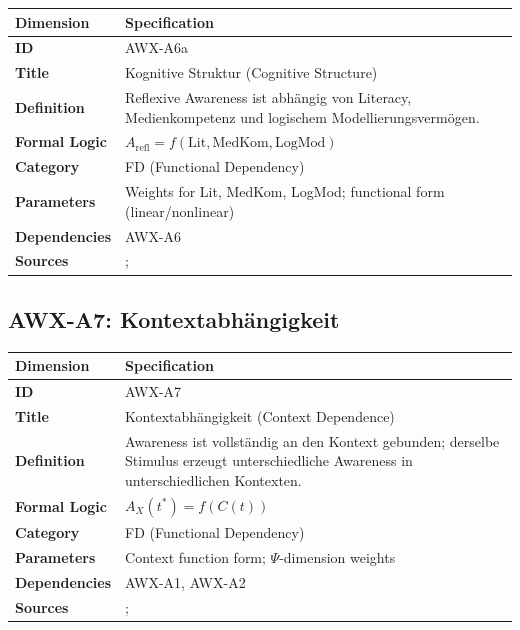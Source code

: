 \begin{table}[htbp]
\small
\begin{tabular}{p{3cm}p{11cm}}
\toprule
\textbf{Dimension} & \textbf{Specification} \\
\midrule
\textbf{ID} & AWX-A6a \\
\textbf{Title} & Kognitive Struktur (Cognitive Structure) \\
\textbf{Definition} & Reflexive Awareness ist abhängig von Literacy, Medienkompetenz und logischem Modellierungsvermögen. \\
\textbf{Formal Logic} & $A_{\text{refl}} = f(\text{Lit}, \text{MedKom}, \text{LogMod})$ \\
\textbf{Category} & FD (Functional Dependency) \\
\textbf{Parameters} & Weights for Lit, MedKom, LogMod; functional form (linear/nonlinear) \\
\textbf{Dependencies} & AWX-A6 \\
\textbf{Sources} & \citet{lusardi2014economic}; \citet{hanushek2012knowledge} \\
\bottomrule
\end{tabular}
\end{table}


\subsection{AWX-A7: Kontextabhängigkeit}

\begin{table}[htbp]
\small
\begin{tabular}{p{3cm}p{11cm}}
\toprule
\textbf{Dimension} & \textbf{Specification} \\
\midrule
\textbf{ID} & AWX-A7 \\
\textbf{Title} & Kontextabhängigkeit (Context Dependence) \\
\textbf{Definition} & Awareness ist vollständig an den Kontext gebunden; derselbe Stimulus erzeugt unterschiedliche Awareness in unterschiedlichen Kontexten. \\
\textbf{Formal Logic} & $A_X(t^*) = f(C(t))$ \\
\textbf{Category} & FD (Functional Dependency) \\
\textbf{Parameters} & Context function form; $\Psi$-dimension weights \\
\textbf{Dependencies} & AWX-A1, AWX-A2 \\
\textbf{Sources} & \citet{PAP-tversky1981framing}; \citet{kahneman1990endowment} \\
\bottomrule
\end{tabular}
\end{table}

